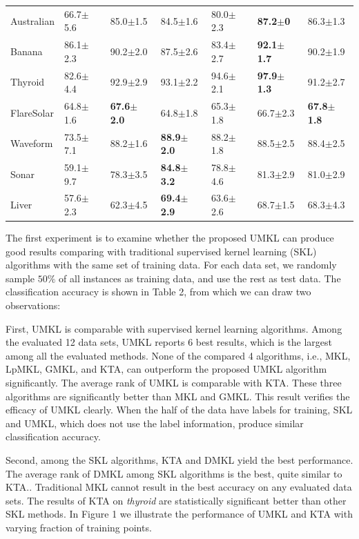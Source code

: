 \begin{table}[!thbp]
\begin{center}
{\begin{tabular}{l|l|lllll}
Australian     &66.7$\pm$5.6  &85.0$\pm$1.5  &84.5$\pm$1.6 &80.0$\pm$2.3 &{\bf 87.2$\pm$0} &86.3$\pm$1.3\\
Banana         &86.1$\pm$2.3     &90.2$\pm$2.0   &87.5$\pm$2.6 &83.4$\pm$2.7 &{\bf 92.1$\pm$1.7} &90.2$\pm$1.9\\
Thyroid        &82.6$\pm$4.4  &92.9$\pm$2.9    &93.1$\pm$2.2 &94.6$\pm$2.1 &{\bf 97.9$\pm$1.3} &91.2$\pm$2.7\\
FlareSolar     &64.8$\pm$1.6 &{\bf67.6$\pm$2.0}   &64.8$\pm$1.8 &65.3$\pm$1.8  &66.7$\pm$2.3  &{\bf67.8$\pm$1.8}\\
Waveform    &73.5$\pm$7.1 &88.2$\pm$1.6   &{\bf 88.9$\pm$2.0} &88.2$\pm$1.8 &88.5$\pm$2.5 &88.4$\pm$2.5\\
Sonar         &59.1$\pm$9.7 &78.3$\pm$3.5&{\bf 84.8$\pm$3.2} &78.8$\pm$4.6 &81.3$\pm$2.9 &81.0$\pm$2.9\\
Liver       &57.6$\pm$2.3       &62.3$\pm$4.5 &{\bf 69.4$\pm$2.9} &63.6$\pm$2.6 &68.7$\pm$1.5 &68.3$\pm$4.3\\
\hline
\end{tabular}
}
\end{center}
\end{table}

The first experiment is to examine whether the proposed UMKL can produce good results comparing with traditional supervised kernel learning (SKL) algorithms with the same set of training data. For each data set, we randomly sample $50\%$ of all instances as training data, and use the rest as test data. The classification accuracy is shown in Table 2, from which we can draw two observations:

First, UMKL is comparable with supervised kernel learning algorithms. Among the evaluated 12 data sets, UMKL reports 6 best results, which is the largest among all the evaluated methods. None of the compared 4 algorithms, i.e., MKL, LpMKL, GMKL, and KTA, can outperform the proposed UMKL algorithm significantly. The average rank of UMKL is comparable with KTA. These three algorithms are significantly better than MKL and GMKL. This result verifies the efficacy of UMKL clearly. When the half of the data have labels for training, SKL and UMKL, which does not use the label information, produce similar classification accuracy.

Second, among the SKL algorithms, KTA and DMKL yield the best performance. The average rank of DMKL among SKL algorithms is the best, quite similar to KTA.. Traditional MKL cannot result in the best accuracy on any evaluated data sets. The results of KTA on {\em thyroid} are statistically significant better than other SKL methods. In Figure 1 we illustrate the performance of UMKL and KTA with varying fraction of training points.

